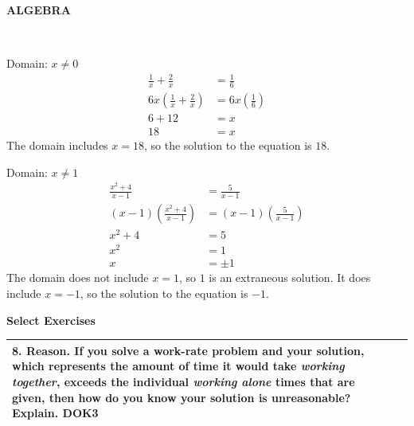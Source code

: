 \documentclass[11pt]{article}
\newcommand{\sidetag}[1]{%
  \begin{tcolorbox}[
    colback=envisionblue,colframe=envisionblue,
    coltext=white,sharp corners,boxrule=0pt,
    width=1.1in,halign=center,
    left=4pt,right=4pt,top=2pt,bottom=2pt
  ]\bfseries #1\end{tcolorbox}%
}
\newcommand{\dok}[1]{%
  \hfill{\bfseries\color{habitsred}DOK#1}%
}
\begin{document}
\vspace{10pt}
\noindent\sidetag{ALGEBRA}\\[-2pt]

\noindent
\begin{minipage}[t]{0.48\linewidth}
Domain: $x \neq 0$
\[
\begin{aligned}
\frac{1}{x} + \frac{2}{x} &= \frac{1}{6} \\[2pt]
6x\!\left(\frac{1}{x} + \frac{2}{x}\right) &= 6x\!\left(\frac{1}{6}\right) \\
6 + 12 &= x \\
18 &= x
\end{aligned}
\]
The domain includes $x = 18$, so the solution to the equation is $18$.
\end{minipage}\hfill
\begin{minipage}[t]{0.48\linewidth}
Domain: $x \neq 1$
\[
\begin{aligned}
\frac{x^2 + 4}{x - 1} &= \frac{5}{x - 1} \\[2pt]
(x-1)\!\left(\frac{x^2+4}{x-1}\right) &= (x-1)\!\left(\frac{5}{x-1}\right) \\
x^2 + 4 &= 5 \\
x^2 &= 1 \\
x &= \pm 1
\end{aligned}
\]
The domain does not include $x = 1$, so $1$ is an extraneous solution. It does include $x = -1$, so the solution to the equation is $-1$.
\end{minipage}

\newpage

\begin{center}{\Large\bfseries Select Exercises}\end{center}

\newcommand{\exerciserow}[2]{%
  \noindent\begin{tabularx}{\linewidth}{|>{\raggedright\arraybackslash}p{2.9in}|X|}
  \hline
  #1 & \\[#2] \hline
  \end{tabularx}\par\vspace{2pt}%
}

\exerciserow{%
\textbf{8. Reason.} If you solve a work-rate problem and your solution, which represents the amount of time it would take \textit{working together}, exceeds the individual \textit{working alone} times that are given, then how do you know your solution is unreasonable? Explain. \dok{3}%
}{1.4in}
\end{document}
